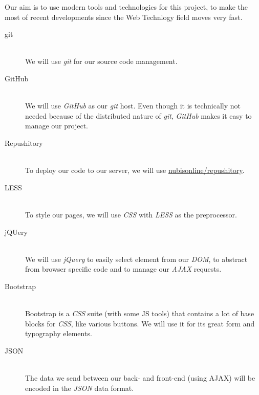 Our aim is to use modern tools and technologies for this project, to make the most of recent developments since the Web Technlogy field moves very fast.

\begin{description}
	\item[git]\hfill\\
		We will use \textit{git} for our source code management.
		
	\item[GitHub]\hfill\\
		We will use \textit{GitHub} as our \textit{git} host. Even though it is technically not needed because of the distributed nature of \textit{git}, \textit{GitHub} makes it easy to manage our project.
	
	\item[Repushitory]\hfill\\
		To deploy our code to our server, we will use \href{https://github.com/nubisonline/repushitory}{nubisonline/repushitory}.

	\item[LESS]\hfill\\
		To style our pages, we will use \textit{CSS} with \textit{LESS} as the preprocessor.

	\item[jQUery]\hfill\\
		We will use \textit{jQuery} to easily select element from our \textit{DOM}, to abstract from browser specific code and to manage our \textit{AJAX} requests.

	\item[Bootstrap]\hfill\\
		Bootstrap is a \textit{CSS} suite (with some JS tools) that contains a lot of base blocks for \textit{CSS}, like various buttons.
		We will use it for its great form and typography elements.

	\item[JSON]\hfill\\
		The data we send between our back- and front-end (using AJAX) will be encoded in the \textit{JSON} data format.
\end{description}
